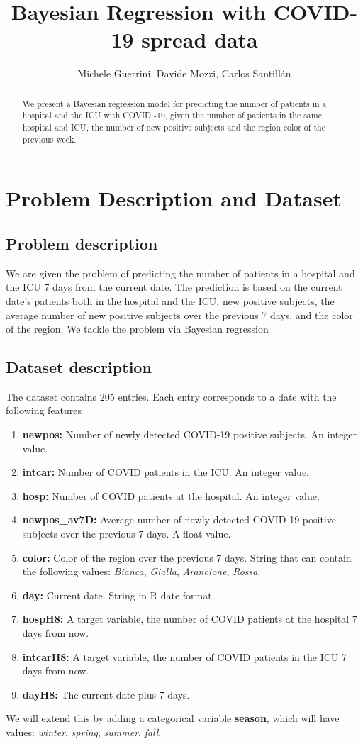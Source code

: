 \documentclass[12pt,a4paper]{article}
\title{Bayesian Regression with COVID-19 spread data}
\author{Michele Guerrini, Davide Mozzi, Carlos Santillán}
\theoremstyle{definition}
\theoremstyle{remark}
\begin{document}
	\maketitle
	\begin{abstract}
		We present a Bayesian regression model for predicting the number of patients in a hospital and the ICU with COVID -19, given the number of patients in the same hospital and ICU, the number of new positive subjects and the region color of the previous week. 
	\end{abstract}
	
	\tableofcontents
	\newpage
	\section{Problem Description and Dataset}
	\subsection{Problem description}
	We are given the problem of predicting the number of patients in a hospital and the ICU 7 days from the current date. The prediction is based on the current date's patients both in the hospital and the ICU, new positive subjects, the average number of new positive subjects over the previous 7 days, and the color of the region. We tackle the problem via Bayesian regression
	\subsection{Dataset description}
	The dataset contains 205 entries. Each entry corresponds to a date with the following features
	\begin{enumerate}
		\item \textbf{newpos:} Number of newly detected COVID-19 positive subjects. An integer value.
		\item \textbf{intcar:} 	Number of COVID patients in the ICU. An integer value.
		\item \textbf{hosp:} Number of COVID patients at the hospital. An integer value.
		\item \textbf{newpos\_av7D:} Average number of newly detected COVID-19 positive subjects over the previous 7 days. A float value.
		\item \textbf{color:} Color of the region over the previous 7 days. String that can contain the following values: \textit{Bianca}, \textit{Gialla}, \textit{Arancione}, \textit{Rossa}.
		\item \textbf{day:} Current date. String in R date format.
		\item \textbf{hospH8:} A target variable, the number of COVID patients at the hospital 7 days from now.
		\item \textbf{intcarH8:} A target variable, the number of COVID patients in the ICU 7 days from now.
		\item \textbf{dayH8:} The current date plus 7 days. 
	\end{enumerate}
	We will extend this by adding a categorical variable \textbf{season}, which will have values: \textit{winter}, \textit{spring}, \textit{summer}, \textit{fall}.
\end{document}
